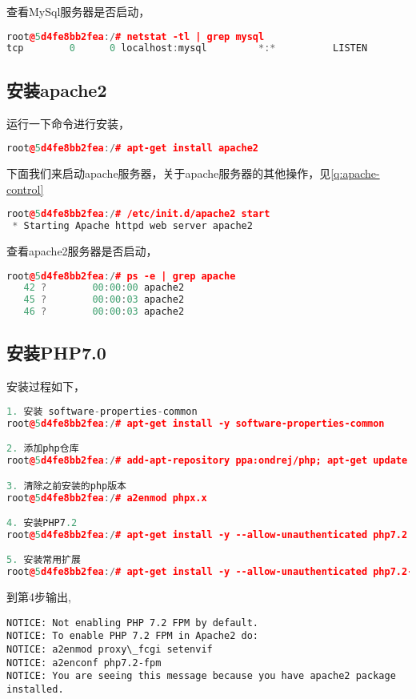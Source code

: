 \documentclass[a4]{article}
\begin{document}
查看MySql服务器是否启动，
\begin{lstlisting}[language=C++]
root@5d4fe8bb2fea:/# netstat -tl | grep mysql
tcp        0      0 localhost:mysql         *:*          LISTEN     
\end{lstlisting}

\subsection{安装apache2}
运行一下命令进行安装，
\begin{lstlisting}[language=C++]
root@5d4fe8bb2fea:/# apt-get install apache2
\end{lstlisting}

下面我们来启动apache服务器，关于apache服务器的其他操作，见\ref{q:apache-control}
\begin{lstlisting}[language=C++]
root@5d4fe8bb2fea:/# /etc/init.d/apache2 start
 * Starting Apache httpd web server apache2                                      * 
\end{lstlisting}

查看apache2服务器是否启动，
\begin{lstlisting}[language=C++]
root@5d4fe8bb2fea:/# ps -e | grep apache
   42 ?        00:00:00 apache2
   45 ?        00:00:03 apache2
   46 ?        00:00:03 apache2
\end{lstlisting}

\subsection{安装PHP7.0}
安装过程如下，
\begin{lstlisting}[language=C++]
1. 安装 software-properties-common
root@5d4fe8bb2fea:/# apt-get install -y software-properties-common 

2. 添加php仓库
root@5d4fe8bb2fea:/# add-apt-repository ppa:ondrej/php; apt-get update

3. 清除之前安装的php版本
root@5d4fe8bb2fea:/# a2enmod phpx.x

4. 安装PHP7.2
root@5d4fe8bb2fea:/# apt-get install -y --allow-unauthenticated php7.2

5. 安装常用扩展
root@5d4fe8bb2fea:/# apt-get install -y --allow-unauthenticated php7.2-fpm php7.2-mysql php7.2-curl php7.2-json php7.2-mbstring php7.2-xml  php7.2-intl php7.2-odbc php7.2-cgi

\end{lstlisting}

到第4步输出,
\begin{lstlisting}
NOTICE: Not enabling PHP 7.2 FPM by default.
NOTICE: To enable PHP 7.2 FPM in Apache2 do:
NOTICE: a2enmod proxy\_fcgi setenvif
NOTICE: a2enconf php7.2-fpm
NOTICE: You are seeing this message because you have apache2 package installed.
\end{lstlisting}
\end{document}
